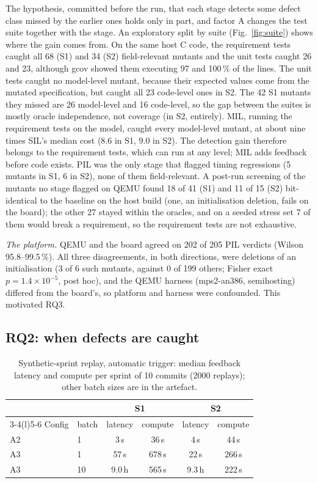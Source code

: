 \documentclass[conference]{IEEEtran}
\begin{document}
The hypothesis, committed before the run, that each stage detects some defect class missed by the earlier
ones holds only in part, and factor A changes the test suite together with the stage. An exploratory split by suite
(Fig.~\ref{fig:suite}) shows where the gain comes from. On the same host C code, the requirement tests caught all 68 (S1) and 34
(S2) field-relevant mutants and the unit tests caught 26 and 23, although gcov showed them executing 97 and
100\,\% of the lines. The unit tests caught no model-level mutant, because their expected values come from
the mutated specification, but caught all 23 code-level ones in S2. The 42 S1 mutants they missed are 26 model-level and 16 code-level, so the gap between the suites is mostly oracle independence, not
coverage (in S2, entirely).
MIL, running the requirement tests on the model, caught every
model-level mutant, at about nine times SIL's median cost (8.6 in S1, 9.0 in S2). The detection gain therefore
belongs to the requirement tests, which can run at any level; MIL adds feedback before code exists. PIL was
the only stage that flagged timing regressions (5 mutants in S1, 6 in
S2), none of them field-relevant. A post-run
screening of the mutants no stage flagged on QEMU found 18 of 41 (S1) and 11 of 15 (S2) bit-identical to the
baseline on the host build (one, an initialisation deletion, fails on the board); the other 27 stayed within
the oracles, and on a seeded stress set 7 of them would break a requirement, so the requirement tests are not
exhaustive.

\emph{The platform.} QEMU and the board agreed on 202 of 205 PIL verdicts (Wilson 95.8--99.5\,\%). All three
disagreements, in both directions, were deletions of an initialisation (3 of 6 such mutants, against 0 of 199
others; Fisher exact $p=1.4\times10^{-5}$, post hoc), and the QEMU harness (mps2-an386, semihosting)
differed from the board's, so platform and harness were confounded. This motivated RQ3.

\subsection{RQ2: when defects are caught}

\begin{table}[t]
\caption{Synthetic-sprint replay, automatic trigger: median feedback latency and compute per sprint of 10
commits (2000 replays); other batch sizes are in the artefact.}
\label{tab:e2}
\centering
\footnotesize
\setlength{\tabcolsep}{4pt}
\begin{tabular}{@{}llcccc@{}}
\toprule
 & & \multicolumn{2}{c}{S1} & \multicolumn{2}{c}{S2}\\
\cmidrule(lr){3-4}\cmidrule(l){5-6}
Config & batch & latency & compute & latency & compute\\
\midrule
A2 & 1  & 3\,s   & 36\,s  & 4\,s   & 44\,s\\
A3 & 1  & 57\,s  & 678\,s & 22\,s  & 266\,s\\
A3 & 10 & 9.0\,h & 565\,s & 9.3\,h & 222\,s\\
\bottomrule
\end{tabular}
\end{table}
\end{document}
